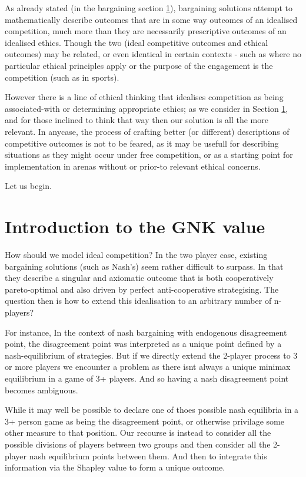 As already stated (in the bargaining section \ref{}), bargaining solutions attempt to mathematically describe outcomes that are in some way outcomes of an idealised competition, much more than they are necessarily prescriptive outcomes of an idealised ethics.
Though the two (ideal competitive outcomes and ethical outcomes) may be related, or even identical in certain contexts - such as where no particular ethical principles apply or the purpose of the engagement is the competition (such as in sports).

However there is a line of ethical thinking that idealises competition as being associated-with or determining appropriate ethics; as we consider in Section \ref{}, and for those inclined to think that way then our solution is all the more relevant.
In anycase, the process of crafting better (or different) descriptions of competitive outcomes is not to be feared, as it may be usefull for describing situations as they might occur under free competition, or as a starting point for implementation in arenas without or prior-to relevant ethical concerns.

Let us begin.

\section{Introduction to the GNK value}

How should we model ideal competition? In the two player case, existing bargaining solutions (such as Nash's) seem rather difficult to surpass. In that they describe a singular and axiomatic outcome that is both cooperatively pareto-optimal and also driven by perfect anti-cooperative strategising.
The question then is how to extend this idealisation to an arbitrary number of n-players?

For instance, In the context of nash bargaining with endogenous disagreement point, the disagreement point was interpreted as a unique point defined by a nash-equilibrium of strategies.
But if we directly extend the 2-player process to 3 or more players we encounter a problem as there isnt always a unique minimax equilibrium in a game of 3+ players.
And so having a nash disagreement point becomes ambiguous.

While it may well be possible to declare one of thoes possible nash equilibria in a 3+ person game as being the disagreement point, or otherwise privilage some other measure to that position.
Our recourse is instead to consider all the possible divisions of players between two groups and then consider all the 2-player nash equilibrium points between them. And then to integrate this information via the Shapley value to form a unique outcome.

